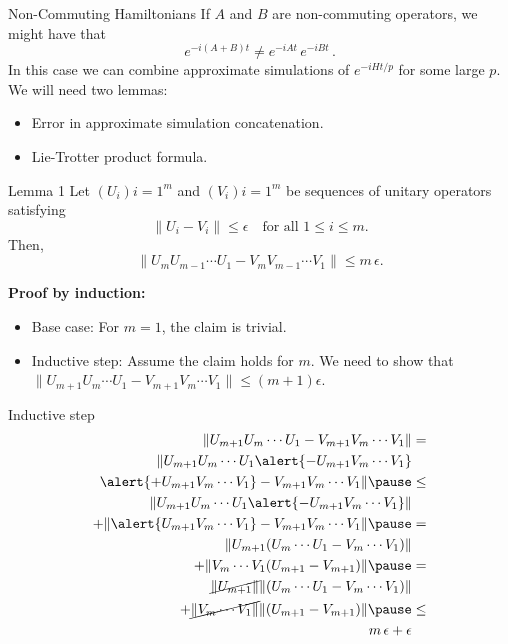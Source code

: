 \documentclass[aspectratio=169,xcolor=dvipsnames]{beamer}
\begin{document}



\begin{frame}{Non-Commuting Hamiltonians}
If \(A\) and \(B\) are non-commuting operators, we might have that
\[
e^{-i(A+B)t} \neq e^{-iAt}\,e^{-iBt}\,.
\]
In this case we can combine approximate simulations of
\(
e^{-iHt/p} 
\)
for some large \(p\). We will need two lemmas:
\begin{itemize}
    \item Error in approximate simulation concatenation.
    \item Lie-Trotter product formula.
\end{itemize}
\end{frame}

\begin{frame}{Lemma 1}
Let \((U_i){i=1}^m\) and \((V_i){i=1}^m\) be sequences of unitary operators satisfying
\[
\|U_i - V_i\| \le \epsilon \quad \text{for all } 1 \le i \le m.
\]
Then,
\[
\|U_m U_{m-1} \cdots U_1 - V_m V_{m-1} \cdots V_1\| \le m\,\epsilon.
\]

\textbf{Proof by induction:}

\begin{itemize}
  \item Base case: For \(m=1\), the claim is trivial.
  \item Inductive step: Assume the claim holds for \(m\). We need to show that
\(
\|U_{m+1}U_m \cdots U_1 - V_{m+1}V_m \cdots V_1\| \le (m+1)\epsilon.
\)
\end{itemize}

\end{frame}

\begin{frame}{Inductive step}
\[
\begin{aligned}
\|U_{m+1}U_m\cdots U_1 - V_{m+1}V_m\cdots V_1\| 
&= \\
\|U_{m+1}U_m\cdots U_1 \alert{-U_{m+1}V_m\cdots V_1} \\ \alert{+ U_{m+1}V_m\cdots V_1} 
- V_{m+1}V_m\cdots V_1\|
\pause
&\leq \\ 
\|U_{m+1}U_m\cdots U_1 \alert{-U_{m+1}V_m\cdots V_1}\| \\ + \|\alert{ U_{m+1}V_m\cdots V_1} 
- V_{m+1}V_m\cdots V_1\| 
\pause
&= \\
\|U_{m+1} (U_m\cdots U_1 -V_m\cdots V_1)\| \\ + \| V_m\cdots V_1
(U_{m+1} - V_{m+1})\|
\pause
&= \\
\cancel{\|U_{m+1}\|} \|(U_m\cdots U_1 -V_m\cdots V_1)\| \\ + \cancel{\|V_m\cdots V_1\|}\|
(U_{m+1} - V_{m+1})\|
\pause
&\leq \\
m\,\epsilon + \epsilon
\end{aligned}
\]
\end{frame}
\end{document}
